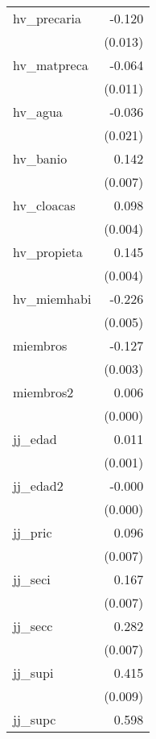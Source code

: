 {\begin{longtable}{l*{1}{D{.}{.}{-1}}}
\addlinespace
hv\_precaria &      -0.120\sym{***}\\
            &     (0.013)         \\
\addlinespace
hv\_matpreca &      -0.064\sym{***}\\
            &     (0.011)         \\
\addlinespace
hv\_agua     &      -0.036         \\
            &     (0.021)         \\
\addlinespace
hv\_banio    &       0.142\sym{***}\\
            &     (0.007)         \\
\addlinespace
hv\_cloacas  &       0.098\sym{***}\\
            &     (0.004)         \\
\addlinespace
hv\_propieta &       0.145\sym{***}\\
            &     (0.004)         \\
\addlinespace
hv\_miemhabi &      -0.226\sym{***}\\
            &     (0.005)         \\
\addlinespace
miembros    &      -0.127\sym{***}\\
            &     (0.003)         \\
\addlinespace
miembros2   &       0.006\sym{***}\\
            &     (0.000)         \\
\addlinespace
jj\_edad     &       0.011\sym{***}\\
            &     (0.001)         \\
\addlinespace
jj\_edad2    &      -0.000\sym{***}\\
            &     (0.000)         \\
\addlinespace
jj\_pric     &       0.096\sym{***}\\
            &     (0.007)         \\
\addlinespace
jj\_seci     &       0.167\sym{***}\\
            &     (0.007)         \\
\addlinespace
jj\_secc     &       0.282\sym{***}\\
            &     (0.007)         \\
\addlinespace
jj\_supi     &       0.415\sym{***}\\
            &     (0.009)         \\
\addlinespace
jj\_supc     &       0.598\sym{***}\\

\end{longtable}}
